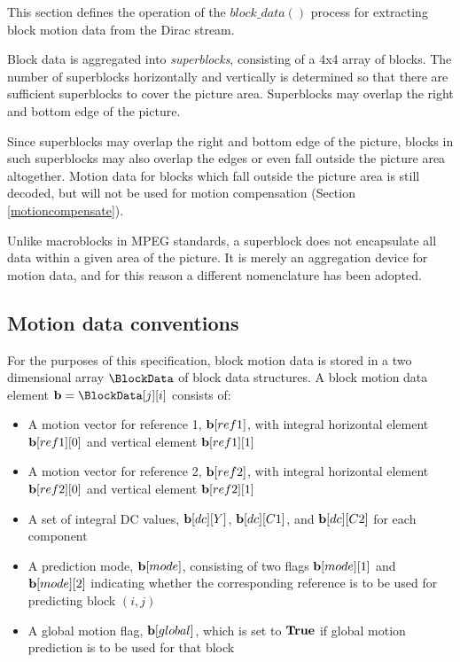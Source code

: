 
\label{motiondec}

This section defines the operation of the $block\_data()$ process for extracting
block motion data from the Dirac stream. 

Block data is aggregated into {\em superblocks}, consisting of a 4x4 array of 
blocks. The number of superblocks horizontally and vertically is determined so 
that there are sufficient superblocks to cover the picture area. Superblocks 
may overlap the right and bottom edge of the picture.

\begin{informative}
Since superblocks may overlap the right and bottom edge of the picture, blocks in such superblocks
may also overlap the edges or even fall outside the picture area altogether. Motion data for 
blocks which fall outside the picture area is still decoded, but will not be used for motion compensation 
(Section \ref{motioncompensate}). 

Unlike macroblocks in MPEG standards, a superblock does not encapsulate all data within a 
given area of the picture. It is merely an aggregation device for motion data, and for this reason
a different nomenclature has been adopted.
\end{informative}

\subsection{Motion data conventions}

\label{motionconventions}

For the purposes of this specification, block motion data is stored in a two dimensional array 
$\BlockData$ of block data structures. A block motion data element ${\bf b}=\BlockData[j][i]$ consists of:

\begin{itemize}
\item A motion vector for reference 1, ${\bf b}[ref1]$, with integral horizontal element ${\bf b}[ref1][0]$ and 
vertical element ${\bf b}[ref1][1]$
\item A motion vector for reference 2, ${\bf b}[ref2]$, with integral horizontal element ${\bf b}[ref2][0]$ and 
vertical element ${\bf b}[ref2][1]$
\item A set of integral DC values, ${\bf b}[dc][Y]$, ${\bf b}[dc][C1]$, and ${\bf b}[dc][C2]$ for each component
\item A prediction mode, ${\bf b}[mode]$, consisting of two flags ${\bf b}[mode][1]$ and ${\bf b}[mode][2]$ 
indicating whether the corresponding reference is to be used for predicting block $(i,j)$
\item A global motion flag, ${\bf b}[global]$, which is set to $\text{\bf{True}}$ if global motion prediction is to be used for
that block
\end{itemize}

